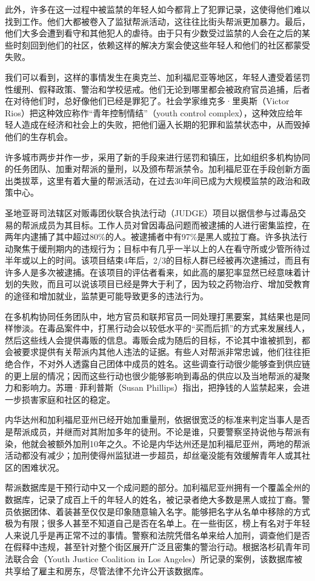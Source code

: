 \documentclass[fontset=fandol, a4paper, 12pt, openright]{ctexbook}
\begin{document}
此外，许多在这一过程中被监禁的年轻人如今都背上了犯罪记录，这使得他们难以找到工作。他们大都被卷入了监狱帮派活动，这往往比街头帮派更加暴力。最后，他们大多会遭到看守和其他犯人的虐待。由于只有少数受过监禁的人会在之后的某些时刻回到他们的社区，依赖这样的解决方案会使这些年轻人和他们的社区都蒙受失败。



我们可以看到，这样的事情发生在奥克兰、加利福尼亚等地区，年轻人遭受着惩罚性缓刑、假释政策、警治和学校惩戒。他们无论到哪里都会被政府官员追捕，后者在对待他们时，总好像他们已经是罪犯了。社会学家维克多·里奥斯（Victor Rios）把这种效应称作“青年控制情结”（youth control complex），这种效应给年轻人造成在经济和社会上的失败，把他们逼入长期的犯罪和监禁状态中，从而毁掉他们的生存机会。

许多城市两步并作一步，采用了新的手段来进行惩罚和镇压，比如组织多机构协同的任务团队、加重对帮派的量刑，以及颁布帮派禁令。加利福尼亚在手段创新方面出类拔萃，这里有着大量的帮派活动，在过去30年间已成为大规模监禁的政治和政策中心。

圣地亚哥司法辖区对贩毒团伙联合执法行动（JUDGE）项目以据信参与过毒品交易的帮派成员为其目标。工作人员对曾因毒品问题而被逮捕的人进行密集监控，在两年内逮捕了其中超过80\%的人。被逮捕者中有97\%是黑人或拉丁裔。许多执法行动聚焦于缓刑期内的违规行为；目标中有几乎一半以上的人在看守所或少管所待过半年或以上的时间。该项目结束4年后，2/3的目标人群已经被再次逮捕过，而且有许多人是多次被逮捕。在该项目的评估者看来，如此高的屡犯率显然已经意味着计划的失败，而且可以说该项目已经是弊大于利了，因为较之药物治疗、增加受教育的途径和增加就业，监禁更可能导致更多的违法行为。

在多机构协同任务团队中，地方官员和联邦官员一同处理打黑要案，其结果也是同样惨淡。在毒品案件中，打黑行动会以较低水平的“买而后抓”的方式来发展线人，然后这些线人会提供毒贩的信息。毒贩会成为随后的目标，不论其中谁被抓到，都会被要求提供有关帮派内其他人违法的证据。有些人对帮派非常忠诚，他们往往拒绝合作，不对外人透露自己团体中成员的姓名。这些调查行动很少能够查到供应链的更上层的情况；因而这些行动也很少能够影响到毒品的供应以及当地帮派的凝聚力和影响力。苏珊·菲利普斯（Susan Phillips）指出，把挣钱的人监禁起来，会进一步损害家庭和社区的稳定。

内华达州和加利福尼亚州已经开始加重量刑，依据很宽泛的标准来判定当事人是否是帮派成员，并继而对其附加多年的徒刑。不论是谁，只要警察坚持说他与帮派有染，他就会被额外加刑10年之久。不论是内华达州还是加利福尼亚州，两地的帮派活动都没有减少；加刑使得州监狱进一步超员，却丝毫没能有效缓解青年人或其社区的困难状况。

帮派数据库是干预行动中又一个成问题的部分。加利福尼亚州拥有一个覆盖全州的数据库，记录了成百上千的年轻人的姓名，被记录者绝大多数是黑人或拉丁裔。警员依据团体、着装甚至仅仅是印象随意输入名字。能够把名字从名单中移除的方式极为有限；很多人甚至不知道自己是否在名单上。在一些街区，榜上有名对于年轻人来说几乎是再正常不过的事情。警察和法院凭借名单来给人加刑，调查他们是否在假释中违规，甚至针对整个街区展开广泛且密集的警治行动。根据洛杉矶青年司法联合会（Youth Justice Coalition in Los Angeles）所记录的案例，该数据库被共享给了雇主和房东，尽管法律不允许公开该数据库。
\end{document}
